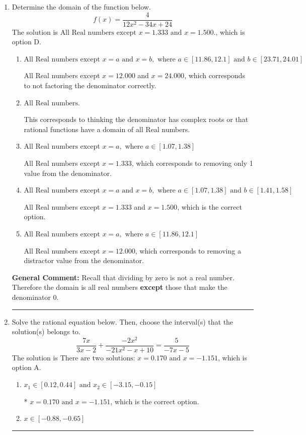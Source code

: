 \documentclass{extbook}[14pt]
\newcommand{\litem}[1]{\item #1

\rule{\textwidth}{0.4pt}}
\begin{document}
\begin{enumerate}\litem{
Determine the domain of the function below.
\[ f(x) = \frac{4}{12x^{2} -34 x + 24} \]The solution is \( \text{All Real numbers except } x = 1.333 \text{ and } x = 1.500. \), which is option D.\begin{enumerate}[label=\Alph*.]
\item \( \text{All Real numbers except } x = a \text{ and } x = b, \text{ where } a \in [11.86, 12.1] \text{ and } b \in [23.71, 24.01] \)

All Real numbers except $x = 12.000$ and $x = 24.000$, which corresponds to not factoring the denominator correctly.
\item \( \text{All Real numbers.} \)

This corresponds to thinking the denominator has complex roots or that rational functions have a domain of all Real numbers.
\item \( \text{All Real numbers except } x = a, \text{ where } a \in [1.07, 1.38] \)

All Real numbers except $x = 1.333$, which corresponds to removing only 1 value from the denominator.
\item \( \text{All Real numbers except } x = a \text{ and } x = b, \text{ where } a \in [1.07, 1.38] \text{ and } b \in [1.41, 1.58] \)

All Real numbers except $x = 1.333$ and $x = 1.500$, which is the correct option.
\item \( \text{All Real numbers except } x = a, \text{ where } a \in [11.86, 12.1] \)

All Real numbers except $x = 12.000$, which corresponds to removing a distractor value from the denominator.
\end{enumerate}

\textbf{General Comment:} Recall that dividing by zero is not a real number. Therefore the domain is all real numbers \textbf{except} those that make the denominator 0.
}
\litem{
Solve the rational equation below. Then, choose the interval(s) that the solution(s) belongs to.
\[ \frac{7x}{3x -2} + \frac{-2x^{2}}{-21x^{2} -x + 10} = \frac{5}{-7x -5} \]The solution is \( \text{There are two solutions: } x = 0.170 \text{ and } x = -1.151 \), which is option A.\begin{enumerate}[label=\Alph*.]
\item \( x_1 \in [0.12, 0.44] \text{ and } x_2 \in [-3.15,-0.15] \)

* $x = 0.170 \text{ and } x = -1.151$, which is the correct option.
\item \( x \in [-0.88,-0.65] \)



\end{enumerate}}
\end{enumerate}
\end{document}
